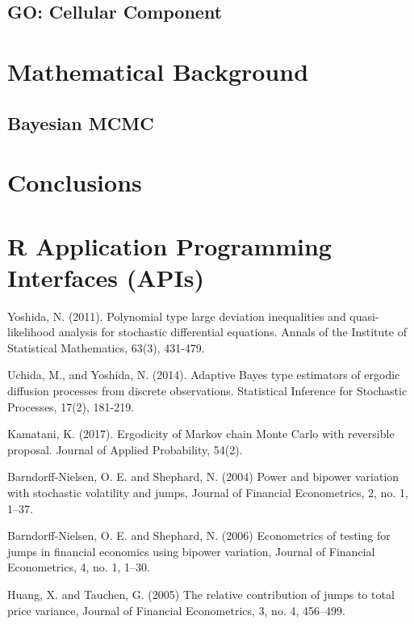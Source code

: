 \subsection{GO: Cellular Component}

\section{Mathematical Background}

\subsection{Bayesian MCMC}



\section{Conclusions}


\section{R Application Programming Interfaces (APIs)}



\begin{thebibliography}{00}
		
Yoshida, N. (2011). 
\newblock Polynomial type large deviation inequalities and quasi-likelihood analysis for stochastic differential equations. 
\newblock Annals of the Institute of Statistical Mathematics, 63(3), 431-479.

Uchida, M., and Yoshida, N. (2014). 
\newblock Adaptive Bayes type estimators of ergodic diffusion processes from discrete observations. 
\newblock Statistical Inference for Stochastic Processes, 17(2), 181-219.

Kamatani, K. (2017).
\newblock Ergodicity of Markov chain Monte Carlo with reversible proposal. 
\newblock Journal of Applied Probability, 54(2).
	
Barndorff-Nielsen, O. E. and Shephard, N. (2004) 
\newblock Power and bipower variation with stochastic volatility and jumps, 
\newblock Journal of Financial Econometrics, 2, no. 1, 1–37.
	
Barndorff-Nielsen, O. E. and Shephard, N. (2006) 
\newblock Econometrics of testing for jumps in financial economics using bipower variation, 
\newblock Journal of Financial Econometrics, 4, no. 1, 1–30.
	
Huang, X. and Tauchen, G. (2005) 
\newblock The relative contribution of jumps to total price variance, 
\newblock Journal of Financial Econometrics, 3, no. 4, 456–499.
	
\end{thebibliography}

